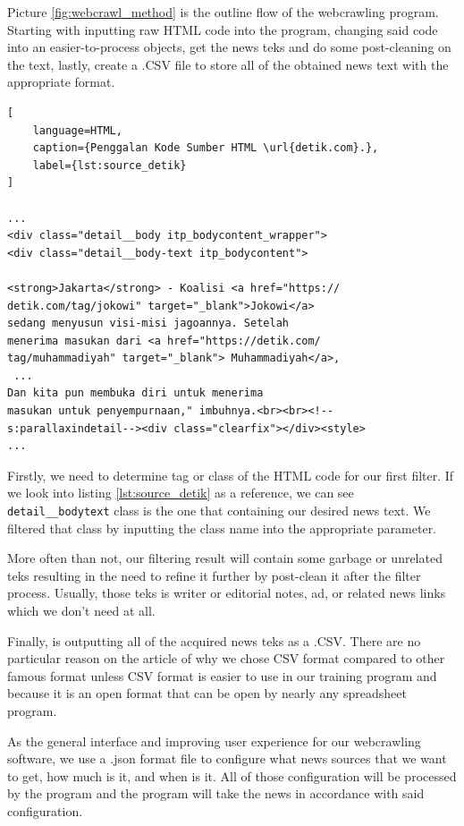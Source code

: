 Picture \ref{fig:webcrawl_method} is the outline flow of the webcrawling program. Starting with inputting raw HTML code into the program, changing said code into an easier-to-process objects, get the news teks and do some post-cleaning on the text, lastly, create a .CSV file to store all of the obtained news text with the appropriate format.

\begin{lstlisting}[
    language=HTML, 
    caption={Penggalan Kode Sumber HTML \url{detik.com}.},
    label={lst:source_detik}
]

...
<div class="detail__body itp_bodycontent_wrapper">
<div class="detail__body-text itp_bodycontent">

<strong>Jakarta</strong> - Koalisi <a href="https://
detik.com/tag/jokowi" target="_blank">Jokowi</a> 
sedang menyusun visi-misi jagoannya. Setelah 
menerima masukan dari <a href="https://detik.com/
tag/muhammadiyah" target="_blank"> Muhammadiyah</a>,
 ... 
Dan kita pun membuka diri untuk menerima 
masukan untuk penyempurnaan," imbuhnya.<br><br><!--
s:parallaxindetail--><div class="clearfix"></div><style>
...

\end{lstlisting}

Firstly, we need to determine tag or class of the HTML code for our first filter. If we look into listing \ref{lst:source_detik} as a reference, we can see \texttt{detail\_\_body\-text} class is the one that containing our desired news text. We filtered that class by inputting the class name into the appropriate parameter.

More often than not, our filtering result will contain some garbage or unrelated teks resulting in the need to refine it further by post-clean it after the filter process. Usually, those teks is writer or editorial notes, ad, or related news links which we don't need at all.

Finally, is outputting all of the acquired news teks as a .CSV. There are no particular reason on the article of why we chose CSV format compared to other famous format unless CSV format is easier to use in our training program and because it is an open format that can be open by nearly any spreadsheet program.

As the general interface and improving user experience for our webcrawling software, we use a .json format file to configure what news sources that we want to get, how much is it, and when is it. All of those configuration will be processed by the program and the program will take the news in accordance with said configuration.
